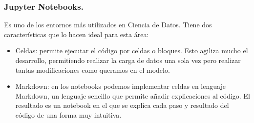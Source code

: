 \documentclass[a4paper,11pt]{article}
\begin{document}
\subsubsection{Jupyter Notebooks.}
Es uno de los entornos más utilizados en Ciencia de Datos. Tiene dos características que lo hacen ideal para esta área:
\begin{itemize}
\item  Celdas: permite ejecutar el código por celdas o bloques. Esto agiliza mucho el desarrollo, permitiendo realizar la carga de datos una sola vez pero realizar tantas modificaciones como queramos en el modelo.
\item Markdown: en los notebooks podemos implementar celdas en lenguaje Markdown, un lenguaje sencillo que permite añadir explicaciones al código. El resultado es un notebook en el que se explica cada paso y resultado del código de una forma muy intuitiva.
\end{itemize}
\end{document}
